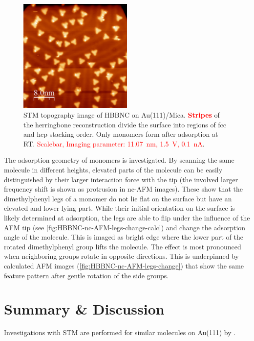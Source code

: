 \begin{figure}[] \centering
	\includegraphics[width=0.5\textwidth]{./images/hbbnc-au-111-rt}
	\caption{STM topography image of HBBNC on Au(111)/Mica. \textcolor{red}{\textbf{Stripes}} of the herringbone reconstruction divide the surface into regions of fcc and hcp stacking order. Only monomers form after adsorption at RT. \textcolor{red}{Scalebar, Imaging parameter: \SI{11.07}{\nano \meter}, \SI{1.5}{\volt}, \SI{0.1}{\nano \ampere}}.}
	\label{}
\end{figure}

The adsorption geometry of monomers is investigated. By scanning the same molecule in different heights, elevated parts of the molecule can be easily distinguished by their larger interaction force with the tip (the involved larger frequency shift is shown as protrusion in nc-AFM images). These show that the dimethylphenyl legs of a monomer do not lie flat on the surface but have an elevated and lower lying part. While their initial orientation on the surface is likely determined at adsorption, the legs are able to flip under the influence of the AFM tip (see \autoref{fig:HBBNC-nc-AFM-legs-change-calc}) and change the adsorption angle of the molecule. This is imaged as bright edge where the lower part of the rotated dimethylphenyl group lifts the molecule. The effect is most pronounced when neighboring groups rotate in opposite directions. This is underpinned by calculated AFM images (\autoref{fig:HBBNC-nc-AFM-legs-change}) that show the same feature pattern after gentle rotation of the side groups. 

\section{Summary \& Discussion}
Investigations with STM are performed for similar molecules on Au(111) by \cite{Krieg_construction_2015}.

